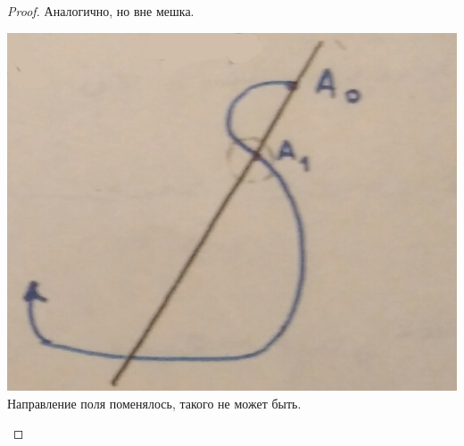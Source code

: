 \begin{proof}
\begin{minipage}{0.32\textwidth}
				\qquad \qquad  Аналогично, \newline \hspace*{13mm} но вне мешка. \newline
		\end{minipage}
		\begin{minipage}{0.31\textwidth}
			\begin{center} \includegraphics[width=1\textwidth]{ch8/pict/pict_2_3.png} 
				Направление поля  \newline поменялось, такого \newline не может быть. \end{center} 
		\end{minipage}		
		
	\end{proof}

